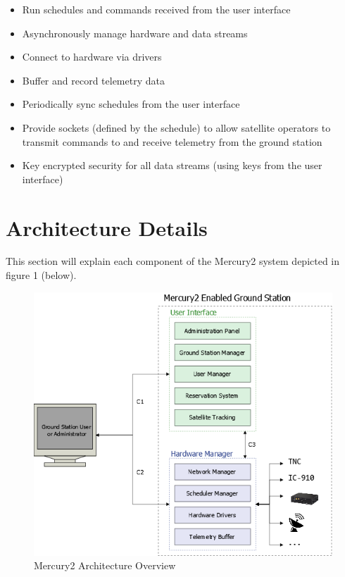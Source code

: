 \documentclass{mxl-design}
\begin{document}
\begin{itemize}
	\item Run schedules and commands received from the user interface
	\item Asynchronously manage hardware and data streams
	\item Connect to hardware via drivers
	\item Buffer and record telemetry data
	\item Periodically sync schedules from the user interface	
	\item Provide sockets (defined by the schedule) to allow satellite operators to transmit commands to and receive telemetry from the ground station
	\item Key encrypted security for all data streams (using keys from the user interface)
\end{itemize}

\clearpage
\part{Architecture Details}
This section will explain each component of the Mercury2 system depicted in figure 1 (below).

\begin{figure}[hbtp]
	\centering
	\includegraphics[scale=.55]{Architecture_Diagram.png}
	\caption{Mercury2 Architecture Overview}
	\label{architecture_diagram}
\end{figure}
\end{document}
